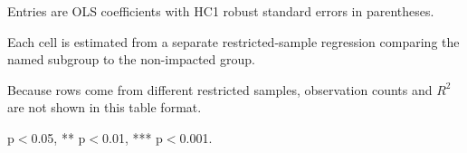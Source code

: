 \begin{table}[!htbp]
\begin{threeparttable}
\begin{tablenotes}[flushleft]
\footnotesize
\item Entries are OLS coefficients with HC1 robust standard errors in parentheses.
\item Each cell is estimated from a separate restricted-sample regression comparing the named subgroup to the non-impacted group.
\item Because rows come from different restricted samples, observation counts and $R^2$ are not shown in this table format.
\item * p$<$0.05, ** p$<$0.01, *** p$<$0.001.
\end{tablenotes}
\end{threeparttable}
\end{table}
